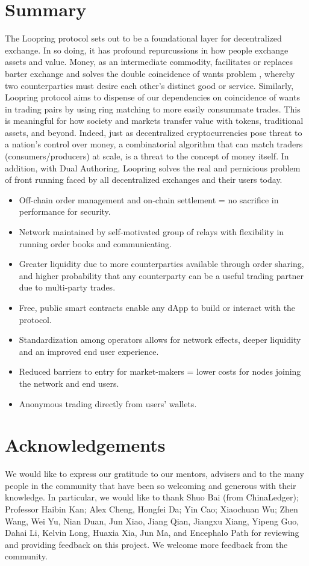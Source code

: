 \documentclass[UTF8,nofonts]{article}
\begin{document}
\begin{multicols}{2}
\section{Summary}
The Loopring protocol sets out to be a foundational layer for decentralized exchange. In so doing, it has profound repurcussions in how people exchange assets and value. Money, as an intermediate commodity, facilitates or replaces barter exchange and solves the double coincidence of wants problem \cite{unenumerated2006}, whereby two counterparties must desire each other's distinct good or service. Similarly, Loopring protocol aims to dispense of our dependencies on coincidence of wants in trading pairs by using ring matching to more easily consummate trades. This is meaningful for how society and markets transfer value with tokens, traditional assets, and beyond. Indeed, just as decentralized cryptocurrencies pose threat to a nation's control over money, a combinatorial algorithm that can match traders (consumers/producers) at scale, is a threat to the concept of money itself. In addition, with Dual Authoring, Loopring solves the real and pernicious problem of front running faced by all decentralized exchanges and their users today.

\begin{itemize}
	\item Off-chain order management and on-chain settlement = no sacrifice in performance for security.
	\item Network maintained by self-motivated group of relays with flexibility in running order books and communicating.
	\item Greater liquidity due to more counterparties available through order sharing, and higher probability that any counterparty can be a useful trading partner due to multi-party trades.
	\item Free, public smart contracts enable any dApp to build or interact with the protocol.
	\item Standardization among operators allows for network effects, deeper liquidity and an improved end user experience.
	\item Reduced barriers to entry for market-makers = lower costs for nodes joining the network and end users.
	\item Anonymous trading directly from users’ wallets.
\end{itemize}

\section{Acknowledgements}
We would like to express our gratitude to our mentors, advisers and to the many people in the community that have been so welcoming and generous with their knowledge. In particular, we would like to thank Shuo Bai (from ChinaLedger); Professor Haibin Kan; Alex Cheng, Hongfei Da; Yin Cao; Xiaochuan Wu; Zhen Wang, Wei Yu, Nian Duan, Jun Xiao, Jiang Qian, Jiangxu Xiang, Yipeng Guo, Dahai Li, Kelvin Long, Huaxia Xia, Jun Ma, and Encephalo Path for reviewing and providing feedback on this project. We welcome more feedback from the community.




\end{multicols}
\end{document}
